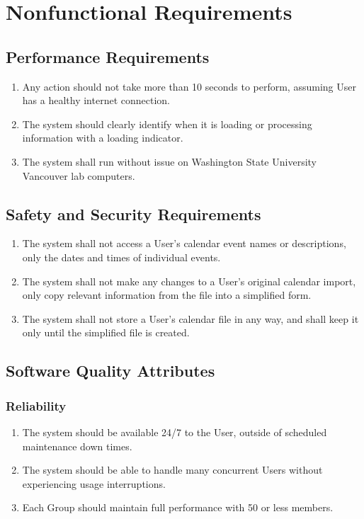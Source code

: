 \documentclass{scrreprt}
\begin{document}
\chapter{Nonfunctional Requirements}

\section{Performance Requirements}
\begin{enumerate}
\item Any action should not take more than 10 seconds to perform, assuming User
has a healthy internet connection.
\item The system should clearly identify when it is loading or processing
information with a loading indicator.
\item The system shall run without issue on Washington State University Vancouver
lab computers.
\end{enumerate}

\section{Safety and Security Requirements}
\begin{enumerate}
\item The system shall not access a User's calendar event names or descriptions,
only the dates and times of individual events.
\item The system shall not make any changes to a User's original calendar import,
only copy relevant information from the file into a simplified form.
\item The system shall not store a User's calendar file in any way, and shall
keep it only until the simplified file is created.
\end{enumerate}

\section{Software Quality Attributes}

\subsection{Reliability}
\begin{enumerate}
\item The system should be available 24/7 to the User, outside of scheduled maintenance
down times.
\item The system should be able to handle many concurrent Users without experiencing
usage interruptions.
\item Each Group should maintain full performance with 50 or less members.
\end{enumerate}
\end{document}
